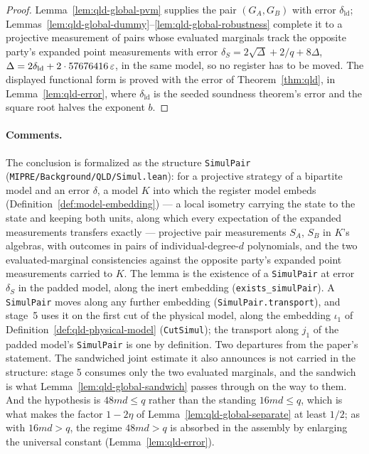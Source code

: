 \begin{proof}
\leanok
Lemma~\ref{lem:qld-global-pvm} supplies the pair $(G_A, G_B)$ with error $\delta_{\mathrm{ld}}$;
Lemmas~\ref{lem:qld-global-dummy}--\ref{lem:qld-global-robustness} complete it to a projective
measurement of pairs whose evaluated marginals track the opposite party's expanded point
measurements with error $\delta_S = 2\sqrt{\Delta} + 2/q + 8\Delta$,
$\Delta = 2\delta_{\mathrm{ld}} + 2 \cdot 57676416\,\varepsilon$, in the same model, so no register has
to be moved. The displayed functional form is proved with the error of Theorem~\ref{thm:qld}, in
Lemma~\ref{lem:qld-error}, where $\delta_{\mathrm{ld}}$ is the seeded soundness theorem's error and
the square root halves the exponent $b$.
\end{proof}

\paragraph{Comments.} The conclusion is formalized as the structure \texttt{SimulPair}
(\texttt{MIPRE/Background/QLD/Simul.lean}): for a projective strategy of a bipartite model and an
error $\delta$, a model $K$ into which the register model embeds
(Definition~\ref{def:model-embedding}) --- a local isometry carrying the state to the state and
keeping both units, along which every expectation of the expanded measurements transfers exactly ---
projective pair measurements $S_A$, $S_B$ in $K$'s algebras, with outcomes in pairs of
individual-degree-$d$ polynomials, and the two evaluated-marginal consistencies against the opposite
party's expanded point measurements carried to $K$. The lemma is the existence of a
\texttt{SimulPair} at error $\delta_S$ in the padded model, along the inert embedding
(\texttt{exists\_simulPair}). A \texttt{SimulPair} moves along any further embedding
(\texttt{SimulPair.transport}), and stage~5 uses it on the first cut of the physical model, along
the embedding $\iota_1$ of Definition~\ref{def:qld-physical-model} (\texttt{CutSimul}); the
transport along $j_1$ of the padded model's \texttt{SimulPair} is one by definition. Two departures
from the paper's statement. The sandwiched joint estimate it also announces is not carried in the
structure: stage 5 consumes only the two evaluated marginals, and the sandwich is what
Lemma~\ref{lem:qld-global-sandwich} passes through on the way to them. And the hypothesis is
$48md \leq q$ rather than the standing $16md \leq q$, which is what makes the factor $1 - 2\eta$ of
Lemma~\ref{lem:qld-global-separate} at least $1/2$; as with $16md > q$, the regime $48md > q$ is
absorbed in the assembly by enlarging the universal constant (Lemma~\ref{lem:qld-error}).

